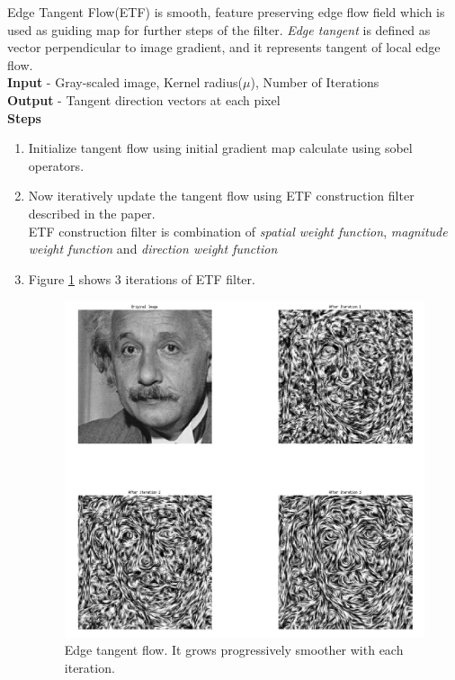\documentclass[a4paper]{article}
\begin{document}
Edge Tangent Flow(ETF) is smooth, feature preserving edge flow field which is used as guiding map for further steps of the filter. \textit{Edge tangent} is defined as vector perpendicular to image gradient, and it represents tangent of local edge flow. 
\\
\textbf{Input} - Gray-scaled image, Kernel radius($\mu$), Number of Iterations\\
\textbf{Output} - Tangent direction vectors at each pixel\\
\textbf{Steps}
\begin{enumerate}
\item Initialize tangent flow using initial gradient map calculate using sobel operators.
\item Now iteratively update the tangent flow using ETF construction filter described in the paper. \\ETF construction filter is combination of \textit{spatial weight function}, \textit{magnitude weight function} and \textit{direction weight function}
\item Figure \ref{fig:ETF} shows 3 iterations of ETF filter. 
\begin{figure}
\centering
\includegraphics[width=1\textwidth]{ETF.png}
\caption{\label{fig:ETF}Edge tangent flow. It grows progressively smoother with each iteration.}
\end{figure}
\end{enumerate}
\end{document}
